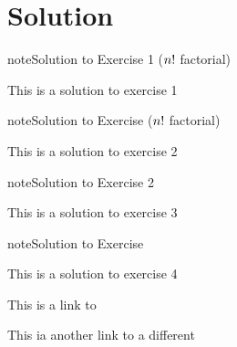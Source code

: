 \chapter{Solution}
\label{\detokenize{solution:solution}}\label{\detokenize{solution::doc}} \label{solution:solution-1}
\begin{sphinxadmonition}{note}{Solution to Exercise 1 (\protect\(n!\protect\) factorial)}



\sphinxAtStartPar
This is a solution to exercise 1
\end{sphinxadmonition}
 \label{solution:solution-2}
\begin{sphinxadmonition}{note}{Solution to Exercise (\protect\(n!\protect\) factorial)}



\sphinxAtStartPar
This is a solution to exercise 2
\end{sphinxadmonition}
 \label{solution:solution-3}
\begin{sphinxadmonition}{note}{Solution to Exercise 2}



\sphinxAtStartPar
This is a solution to exercise 3
\end{sphinxadmonition}
 \label{solution:solution-4}
\begin{sphinxadmonition}{note}{Solution to Exercise}



\sphinxAtStartPar
This is a solution to exercise 4
\end{sphinxadmonition}

\sphinxAtStartPar
This is a link to {\hyperref[\detokenize{solution:solution-1}]{}}

\sphinxAtStartPar
This ia another link to a different {\hyperref[\detokenize{solution:solution-3}]{}}



\renewcommand{\indexname}{Index}
\printindex

